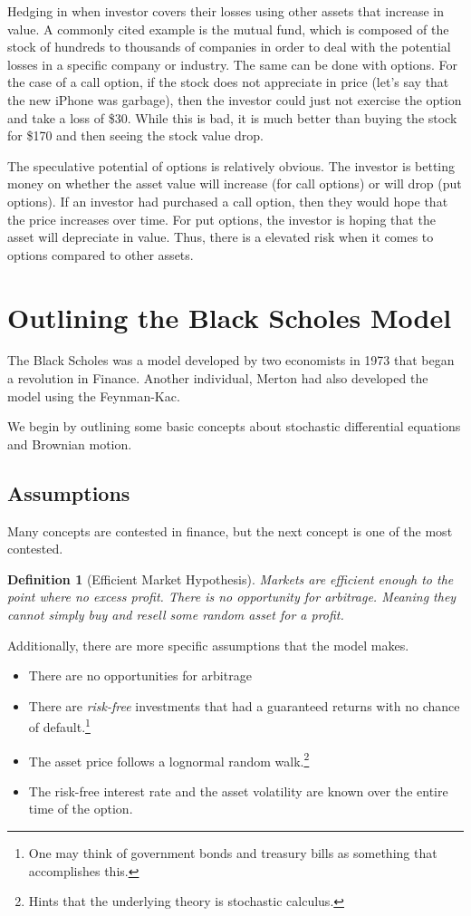 \documentclass{article}
\newtheorem{definition}{Definition}[section]
\begin{document}
Hedging in when investor covers their losses using other assets that increase in value. A commonly cited example is the mutual fund, which is composed
of the stock of hundreds to thousands of companies in order to deal with the potential losses in a specific company or industry. The same can be done with options.
For the case of a call option, if the stock does not appreciate in price (let's say that the new iPhone was garbage), then the investor could just not exercise the option and take a loss of \$30.
While this is bad, it is much better than buying the stock for \$170 and then seeing the stock value drop. 

The speculative potential of options is relatively obvious. The investor is betting money on whether the asset value will increase (for call options) or will drop (put options).
If an investor had purchased a call option, then they would hope that the price increases over time. For put options, the investor is hoping that the asset will depreciate in value.
Thus, there is a elevated risk when it comes to options compared to other assets.




\section{Outlining the Black Scholes Model}
The Black Scholes was a model developed by two economists in 1973 that began a revolution in Finance.
Another individual, Merton had also developed the model using the Feynman-Kac. 

We begin by outlining some basic concepts about stochastic differential equations and Brownian motion. 

\subsection*{Assumptions}
Many concepts are contested in finance, but the next concept is one of the most contested.
\begin{definition}[Efficient Market Hypothesis]
    Markets are efficient enough to the point where no excess profit. There is no opportunity for arbitrage. Meaning they cannot simply buy and resell some random asset for a profit.
\end{definition}
Additionally, there are more specific assumptions that the model makes.
\begin{itemize}
\item There are no opportunities for arbitrage
\item There are \emph{risk-free} investments that had a guaranteed returns with no chance of default.\footnote[1]{One may think of government bonds and treasury bills as something that accomplishes this.}
\item The asset price follows a lognormal random walk.\footnote[2]{Hints that the underlying theory is stochastic calculus.}
\item The risk-free interest rate and the asset volatility are known over the entire time of the option.
\end{itemize}
\end{document}
